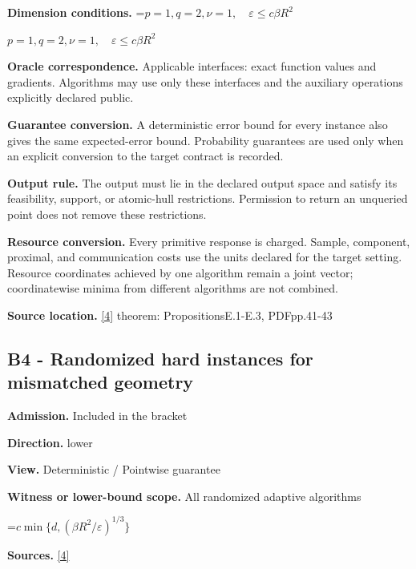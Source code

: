 \documentclass[10pt,a4paper]{article}
\newcommand{\AtlasMath}[1]{\par\begingroup\centering\setbox0=\hbox{$\displaystyle #1$}\ifdim\wd0>1.4\linewidth\typeout{ATLAS WIDE FORMULA: \the\wd0}\fi\ifdim\wd0>\linewidth\resizebox{\linewidth}{!}{\box0}\else\box0\fi\par\endgroup}
\newcommand{\AtlasInlineMath}[1]{\begingroup\setbox0=\hbox{$#1$}\ifdim\wd0>.4\linewidth\endgroup\AtlasMath{#1}\else\endgroup$#1$\fi}
\begin{document}
\textbf{Dimension conditions.} \AtlasInlineMath{p=1,q=2,\nu=1,\quad\varepsilon\le c\beta R^2}



\textbf{Oracle correspondence.} Applicable interfaces: exact function values and gradients. Algorithms may use only these interfaces and the auxiliary operations explicitly declared public.



\textbf{Guarantee conversion.} A deterministic error bound for every instance also gives the same expected-error bound. Probability guarantees are used only when an explicit conversion to the target contract is recorded.



\textbf{Output rule.} The output must lie in the declared output space and satisfy its feasibility, support, or atomic-hull restrictions. Permission to return an unqueried point does not remove these restrictions.



\textbf{Resource conversion.} Every primitive response is charged. Sample, component, proximal, and communication costs use the units declared for the target setting. Resource coordinates achieved by one algorithm remain a joint vector; coordinatewise minima from different algorithms are not combined.



\textbf{Source location.} \href{https://arxiv.org/pdf/2609.32910}{[4]} theorem: PropositionsE.1-E.3, PDFpp.41-43



\subsection{B4 - Randomized hard instances for mismatched geometry}


\textbf{Admission.} Included in the bracket



\textbf{Direction.} lower



\textbf{View.} Deterministic / Pointwise guarantee



\textbf{Witness or lower-bound scope.} All randomized adaptive algorithms



\AtlasMath{c\min\{d,(\beta R^2/\varepsilon)^{1/3}\}}


\textbf{Sources.} \href{https://arxiv.org/pdf/2609.32910}{[4]}
\end{document}
